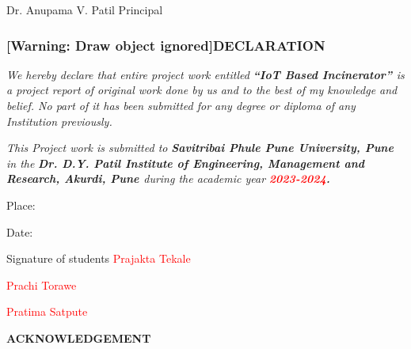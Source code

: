 \documentclass[letterpaper]{article}
\begin{document}
\bigskip

\textcolor[rgb]{0.12156863,0.2784314,0.48235294}{Dr. Anupama V. Patil Principal}
\clearpage\setcounter{page}{1}\pagestyle{Convertedii}
\subsubsection[DECLARATION]{[Warning: Draw object
ignored]\textcolor[rgb]{0.57254905,0.27450982,0.015686275}{DECLARATION}}

\bigskip


\bigskip


\bigskip

\textit{We hereby declare that entire project work entitled
}\textbf{\textit{\textcolor[rgb]{0.42352942,0.17254902,0.62352943}{{}``IoT Based Incinerator'' }}}\textit{is a project
report of original work done by us and to the best of my knowledge and belief. No part of it has been submitted for any
degree or diploma of any Institution previously.}


\bigskip

\textit{This Project work is submitted to }\textbf{\textit{\textcolor[rgb]{0.57254905,0.27450982,0.015686275}{Savitribai
Phule Pune University, Pune }}}\textit{in the }\textbf{\textit{\textcolor[rgb]{0.5019608,0.37254903,0.62352943}{Dr.
D.Y. Patil Institute of Engineering, Management and Research, Akurdi, Pune }}}\textit{during the academic year
}\textbf{\textit{\textcolor{red}{2023-2024}}}\textbf{\textit{.}}


\bigskip


\bigskip


\bigskip


\bigskip


\bigskip


\bigskip


\bigskip


\bigskip


\bigskip

\textcolor[rgb]{0.0,0.12156863,0.37254903}{Place:}

\textcolor[rgb]{0.0,0.12156863,0.37254903}{Date:}

\textcolor[rgb]{0.0,0.12156863,0.37254903}{Signature of students }\textcolor{red}{Prajakta Tekale}

\textcolor{red}{Prachi Torawe}

\textcolor{red}{Pratima Satpute}

\clearpage\setcounter{page}{1}\pagestyle{Convertediii}
{\textbf{\textcolor[rgb]{0.57254905,0.27450982,0.015686275}{ACKNOWLEDGEMENT}}
\par}
\end{document}
